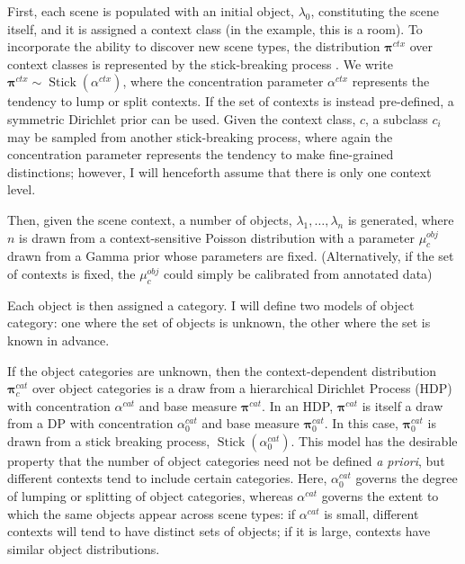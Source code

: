 \documentclass[12pt]{article}
\DeclareMathOperator{\Stick}{Stick}
\begin{document}
First, each scene is populated with an initial object, $\lambda_0$, constituting the scene itself, and it is assigned a context class (in the example, this is a room).  To incorporate the ability to discover new scene types, the distribution $\boldsymbol{\pi}^{ctx}$ over context classes is represented by the stick-breaking process \citep{sethuraman1994constructive}.  We write $\boldsymbol{\pi}^{ctx} \sim \Stick(\alpha^{ctx})$, where the concentration parameter $\alpha^{ctx}$ represents the tendency to lump or split contexts.  If the set of contexts is instead pre-defined, a symmetric Dirichlet prior can be used.  Given the context class, $c$, a subclass $c_i$ may be sampled from another stick-breaking process, where again the concentration parameter represents the tendency to make fine-grained distinctions; however, I will henceforth assume that there is only one context level.

Then, given the scene context, a number of objects, $\lambda_1, \dots, \lambda_n$ is generated, where $n$ is drawn from a context-sensitive Poisson distribution with a parameter $\mu^{obj}_c$ drawn from a Gamma prior whose parameters are fixed.  (Alternatively, if the set of contexts is fixed, the $\mu^{obj}_c$ could simply be calibrated from annotated data)

Each object is then assigned a category.  I will define two models of object category: one where the set of objects is unknown, the other where the set is known in advance.

If the object categories are unknown, then the context-dependent distribution $\boldsymbol{\pi}^{cat}_c$ over object categories is a draw from a hierarchical Dirichlet Process (HDP) \citep{teh2006hierarchical} with concentration $\alpha^{cat}$ and base measure $\boldsymbol{\pi}^{cat}$.  In an HDP, $\boldsymbol{\pi}^{cat}$ is itself a draw from a DP with concentration $\alpha_0^{cat}$ and base measure $\boldsymbol{\pi}_0^{cat}$.  In this case, $\boldsymbol{\pi}_0^{cat}$ is drawn from a stick breaking process, $\Stick(\alpha_0^{cat})$.  This model has the desirable property that the number of object categories need not be defined {\it a priori}, but different contexts tend to include certain categories.  Here, $\alpha_0^{cat}$ governs the degree of lumping or splitting of object categories, whereas $\alpha^{cat}$ governs the extent to which the same objects appear across scene types: if $\alpha^{cat}$ is small, different contexts will tend to have distinct sets of objects; if it is large, contexts have similar object distributions.
\end{document}
